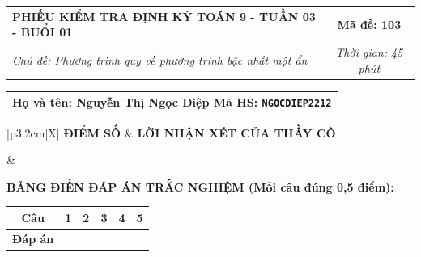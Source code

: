 \documentclass[12pt,a4paper]{article}
\begin{document}
\newpage


\noindent
\begin{tabularx}{\linewidth}{|X|c|}
\hline
\textbf{PHIẾU KIỂM TRA ĐỊNH KỲ TOÁN 9 - TUẦN 03 - BUỔI 01} & \textbf{Mã đề: 103} \\
\textit{Chủ đề: Phương trình quy về phương trình bậc nhất một ẩn} & \textit{Thời gian: 45 phút} \\
\hline
\end{tabularx}

\vspace{1mm}

\noindent
\begin{tabularx}{\linewidth}{|X|}
\hline
\rule[-2mm]{0pt}{7.5mm}\textbf{Họ và tên:} \textbf{\large Nguyễn Thị Ngọc Diệp} \hfill \textbf{Mã HS:} \texttt{NGOCDIEP2212} \quad \\
\hline
\end{tabularx}

\vspace{1mm}

\noindent
\begin{tabularx}{\linewidth}{|p{3.2cm}|X|}
\hline
\centering\textbf{ĐIỂM SỐ} & \centering\textbf{LỜI NHẬN XÉT CỦA THẦY CÔ} \tabularnewline
\hline
\rule{0pt}{1.3cm} & \tabularnewline
\hline
\end{tabularx}

\vspace{1.2mm}

\noindent\textbf{BẢNG ĐIỀN ĐÁP ÁN TRẮC NGHIỆM (Mỗi câu đúng 0,5 điểm):}
\vspace{0.8mm}

\noindent
\renewcommand{\arraystretch}{1.35}
\begin{tabularx}{\linewidth}{|c|*{5}{>{\centering\arraybackslash}X|}}
\hline
\textbf{Câu} & \textbf{1} & \textbf{2} & \textbf{3} & \textbf{4} & \textbf{5} \\
\hline
\textbf{Đáp án} & & & & & \\
\hline
\end{tabularx}
\renewcommand{\arraystretch}{1.0}

\vspace{1.5mm}
\end{document}
